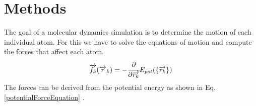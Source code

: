 \chapter{Methods}
\begin{comment}
	0. Verlet Step
	1. Describe the Lenard Jones Potential
	2. Describe the Berendsen Thermostat
	3. Describe the Gupta 
	
\end{comment}
\begin{comment}
	Atoms are discreticed into the Postitions, Velocities and Forces 
	Second propagate the atom in the discriticed realm given constant Forces
		-> Velocity-Verlet Integration
	
	Compute Forces somehow
	-> Potentials
	LJ Potential 
	Gupta Potential
	
	Thermodynamic Effects
	Berendsen Thermostat
		->Gentle Way of resealing the Velocities
		
\end{comment}
\begin{comment}
goals of a md simulation
- determine the motion of each atom
	-> solve equation of motion 
	-> compute forces
	-> From the dirivation of the potential energy we can get the forces

- disciticed in time

\end{comment}
The goal of a molecular dynamics simulation is to determine the motion of each individual atom. For this we have to solve the equations of motion and compute the forces that affect each atom.
\begin{equation}
	\label{potentialForceEquation}
	\overrightarrow{f_{k}}(\overrightarrow{r}_k) = -\cfrac{\displaystyle\partial}{\displaystyle \partial \overrightarrow{r_{k}}} E_{pot}(\{\overrightarrow{r_{k}}\}) 
\end{equation}
The forces can be derived from the potential energy as shown in Eq.  \ref{potentialForceEquation} \cite[][]{molDymCourse}. 


